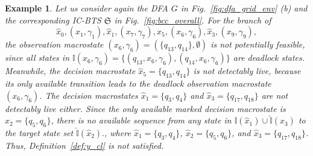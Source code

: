 \documentclass[twocolumn]{autart}
\newtheorem{myexm}{Example}
\begin{document}
%
%
\begin{myexm}\label{ex:y_z_prop}
Let us consider again the DFA $G$ in Fig.~\ref{fig:dfa_grid_env} (b) and the corresponding IC-BTS $\mathfrak{S}$ in Fig.~\ref{fig:bcc_overall}.
%
For the branch of 
$$
\hat{x}_{0}, (x_1, \gamma_1), \hat{x}_{1}, (x_7, \gamma_7), \hat{x}_{5}, (x_6, \gamma_6), \hat{x}_{3}, (x_9, \gamma_9),
$$
the observation macrostate $(x_6, \gamma_6) = (\{ q_{13}, q_{14} \}, \emptyset)$ is not potentially feasible, since all states in 
$
\mathbb{I}(x_6,\gamma_6) = \{(q_{13},x_6,\gamma_6),(q_{14},x_6,\gamma_6)\}
$
are deadlock states.
%
Meanwhile, the decision macrostate $\hat{x}_{5} = \{ q_{13}, q_{14} \}$ is not detectably live, because its only available transition leads to the deadlock observation macrostate $(x_6, \gamma_6)$.
The decision macrostates $\hat{x}_{1} = \{ q_{3}, q_{4} \}$ and $\hat{x}_{3} = \{ q_{17}, q_{18} \}$ are not detectably live either.
Since the only available marked decision macrostate is $\hat{x}_{2} = \{ q_5, q_6 \}$, there is no available sequence from any state in
$
\hat{\mathbb{I}}(\hat{x}_1)\cup \hat{\mathbb{I}}(\hat{x}_3)
$
to the target state set
$
\hat{\mathbb{I}}(\hat{x}_2).
$, 
where $\hat{x}_1 = \{ q_3, q_4 \}$, $\hat{x}_2 = \{ q_5, q_6 \}$, and $\hat{x}_3 = \{ q_{17}, q_{18} \}$. 
Thus, Definition~\ref{def:y_cl} is not satisfied.



\end{myexm}
\end{document}
